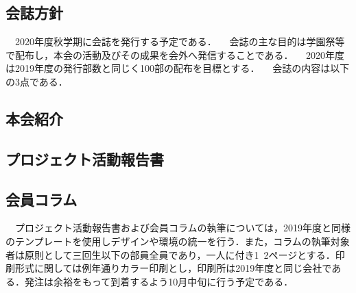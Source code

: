 \subsection*{会誌方針}

　2020年度秋学期に会誌を発行する予定である．
　会誌の主な目的は学園祭等で配布し，本会の活動及びその成果を会外へ発信することである．
　2020年度は2019年度の発行部数と同じく100部の配布を目標とする．
　会誌の内容は以下の3点である．
\subsection*{本会紹介}
\subsection*{プロジェクト活動報告書}
\subsection*{会員コラム}
　プロジェクト活動報告書および会員コラムの執筆については，2019年度と同様のテンプレートを使用しデザインや環境の統一を行う．また，コラムの執筆対象者は原則として三回生以下の部員全員であり，一人に付き1~2ページとする．印刷形式に関しては例年通りカラー印刷とし，印刷所は2019年度と同じ会社である．発注は余裕をもって到着するよう10月中旬に行う予定である．


